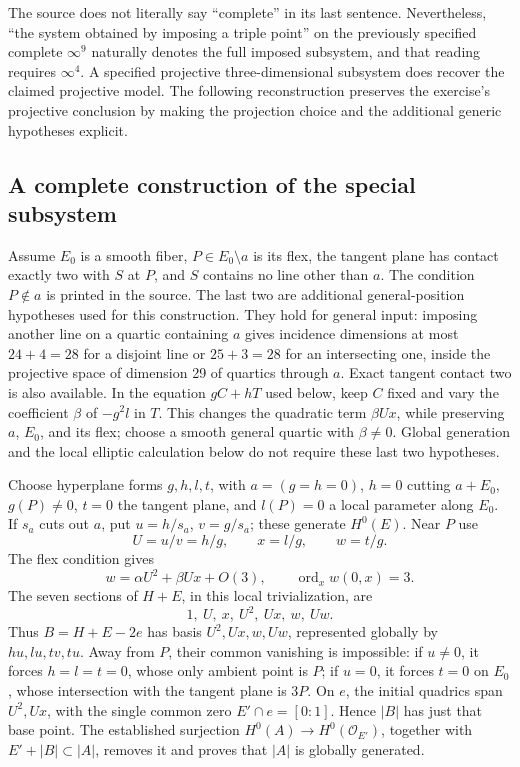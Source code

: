 The source does not literally say ``complete'' in its last sentence. Nevertheless, ``the system obtained by imposing a triple point'' on the previously specified complete \(\infty^9\) naturally denotes the full imposed subsystem, and that reading requires \(\infty^4\). A specified projective three-dimensional subsystem does recover the claimed projective model. The following reconstruction preserves the exercise's projective conclusion by making the projection choice and the additional generic hypotheses explicit.

\subsection{A complete construction of the special subsystem}

Assume \(E_0\) is a smooth fiber, \(P\in E_0\setminus a\) is its flex, the tangent plane has contact exactly two with \(S\) at \(P\), and \(S\) contains no line other than \(a\). The condition \(P\notin a\) is printed in the source. The last two are additional general-position hypotheses used for this construction. They hold for general input: imposing another line on a quartic containing \(a\) gives incidence dimensions at most \(24+4=28\) for a disjoint line or \(25+3=28\) for an intersecting one, inside the projective space of dimension 29 of quartics through \(a\). Exact tangent contact two is also available. In the equation \(gC+hT\) used below, keep \(C\) fixed and vary the coefficient \(\beta\) of \(-g^2l\) in \(T\). This changes the quadratic term \(\beta Ux\), while preserving \(a\), \(E_0\), and its flex; choose a smooth general quartic with \(\beta\ne0\). Global generation and the local elliptic calculation below do not require these last two hypotheses.

Choose hyperplane forms \(g,h,l,t\), with \(a=(g=h=0)\), \(h=0\) cutting \(a+E_0\), \(g(P)\ne0\), \(t=0\) the tangent plane, and \(l(P)=0\) a local parameter along \(E_0\). If \(s_a\) cuts out \(a\), put \(u=h/s_a\), \(v=g/s_a\); these generate \(H^0(E)\). Near \(P\) use \[
U=u/v=h/g,\qquad x=l/g,\qquad w=t/g.
\] The flex condition gives \[
w=\alpha U^2+\beta Ux+O(3),\qquad
\operatorname{ord}_x w(0,x)=3.
\] The seven sections of \(H+E\), in this local trivialization, are \[
1,\ U,\ x,\ U^2,\ Ux,\ w,\ Uw.
\] Thus \(B=H+E-2e\) has basis \(U^2,Ux,w,Uw\), represented globally by \(hu,lu,tv,tu\). Away from \(P\), their common vanishing is impossible: if \(u\ne0\), it forces \(h=l=t=0\), whose only ambient point is \(P\); if \(u=0\), it forces \(t=0\) on \(E_0\), whose intersection with the tangent plane is \(3P\). On \(e\), the initial quadrics span \(U^2,Ux\), with the single common zero \(E'\cap e=[0:1]\). Hence \(|B|\) has just that base point. The established surjection \(H^0(A)\to H^0(\mathcal O_{E'})\), together with \(E'+|B|\subset|A|\), removes it and proves that \(|A|\) is globally generated.

